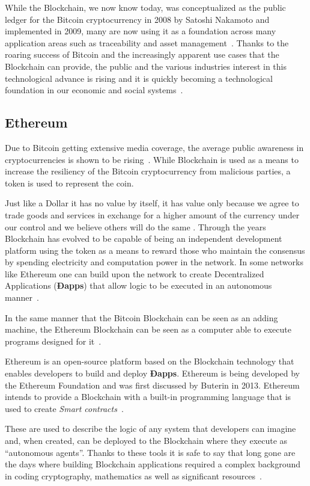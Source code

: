 While the Blockchain, we now know today, was conceptualized as the public
ledger for the Bitcoin cryptocurrency in 2008 by Satoshi Nakamoto and
implemented in 2009, many are now using it as a foundation across many
application areas such as traceability and asset management~\cite{MIT2016}.
Thanks to the roaring success of Bitcoin and the increasingly apparent use
cases that the Blockchain can provide, the public and the various industries
interest in this technological advance is rising and it is quickly becoming a
technological foundation in our economic and social systems~\cite{Zago2018,
Marr2018,Long2018}.

\subsection{Ethereum}

Due to Bitcoin getting extensive media coverage, the average public awareness
in cryptocurrencies is shown to be rising~\cite{BitAwareness2017}. While
Blockchain is used as a means to increase the resiliency of the Bitcoin
cryptocurrency from malicious parties, a token is used to represent the coin. 

Just like a Dollar it has no value by itself, it has value only because we
agree to trade goods and services in exchange for a higher amount of the
currency under our control and we believe others will do the same
\cite{aliessi2016}. Through the years Blockchain has evolved to be capable of
being an independent development platform using the token as a means to reward
those who maintain the consensus by spending electricity and computation power
in the network. In some networks like Ethereum one can build upon the network
to create Decentralized Applications (\textbf{Ðapps}) that allow logic to be
executed in an autonomous manner~\cite{Wood2017}. 

In the same manner that the Bitcoin Blockchain can be seen as an adding
machine, the Ethereum Blockchain can be seen as a computer able to execute
programs designed for it~\cite{Wood2015}.

Ethereum is an open-source platform based on the Blockchain technology that
enables developers to build and deploy \textbf{Ðapps}. Ethereum is being
developed by the Ethereum Foundation and was first discussed by Buterin in
2013.  Ethereum intends to provide a Blockchain with a built-in programming
language that is used to create \textit{Smart contracts}~\cite{Wood2017}.

These are used to describe the logic of any system that developers can imagine
and, when created, can be deployed to the Blockchain where they execute as
“autonomous agents”.  Thanks to these tools it is safe to say that long gone
are the days where building Blockchain applications required a complex
background in coding cryptography, mathematics as well as significant
resources~\cite{Wood2017,BlockGeeks2017}.

